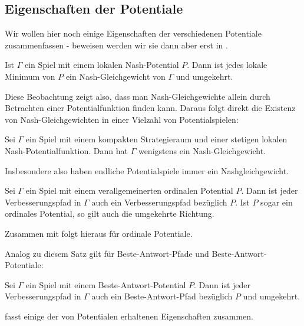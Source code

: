 \subsection{Eigenschaften der Potentiale}

Wir wollen hier noch einige Eigenschaften der verschiedenen Potentiale zusammenfassen - beweisen werden wir sie dann aber erst in .

\begin{beob}\label{beob:lokMinNG}
	Ist $\Gamma$ ein Spiel mit einem lokalen Nash-Potential $P$. Dann ist jedes lokale Minimum von $P$ ein Nash-Gleichgewicht von $\Gamma$ und umgekehrt.
\end{beob}

Diese Beobachtung zeigt also, dass man Nash-Gleichgewichte allein durch Betrachten einer Potentialfunktion finden kann. Daraus folgt direkt die Existenz von Nash-Gleichgewichten in einer Vielzahl von Potentialspielen:

\begin{kor}
	Sei $\Gamma$ ein Spiel mit einem kompakten Strategieraum und einer stetigen lokalen Nash-Potentialfunktion. Dann hat $\Gamma$ wenigstens ein Nash-Gleichgewicht.
\end{kor}

Insbesondere also haben endliche Potentialspiele immer ein Nashgleichgewicht. 

\begin{prop}
	Sei $\Gamma$ ein Spiel mit einem verallgemeinerten ordinalen Potential $P$. Dann ist jeder Verbesserungspfad in $\Gamma$ auch ein Verbesserungspfad bezüglich $P$. Ist $P$ sogar ein ordinales Potential, so gilt auch die umgekehrte Richtung.
\end{prop}

Zusammen mit  folgt hieraus  für ordinale Potentiale.

Analog zu diesem Satz gilt für Beste-Antwort-Pfade und Beste-Antwort-Potentiale:

\begin{prop}
	Sei $\Gamma$ ein Spiel mit einem Beste-Antwort-Potential $P$. Dann ist jeder Verbesserungspfad in $\Gamma$ auch ein Beste-Antwort-Pfad bezüglich $P$ und umgekehrt.
\end{prop}

 fasst einige der von Potentialen erhaltenen Eigenschaften zusammen.


